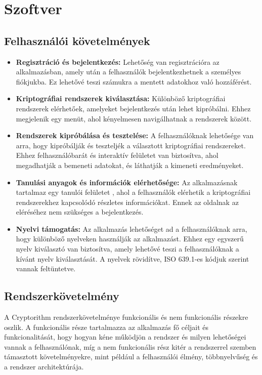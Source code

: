 \chapter{Szoftver}

\section{Felhasználói követelmények}

\begin{itemize}
	\item\textbf{Regisztráció és bejelentkezés:} Lehetőség van regisztrációra az alkalmazásban, amely után a felhasználók bejelentkezhetnek a személyes fiókjukba. Ez lehetővé teszi számukra a mentett adatokhoz való hozzáférést.

	\item\textbf{Kriptográfiai rendszerek kiválasztása:} Különböző kriptográfiai rendszerek elérhetőek, amelyeket bejelentkezés után lehet kipróbálni. Ehhez megjelenik egy menüt, ahol kényelmesen navigálhatnak a rendszerek között.

	\item\textbf{Rendszerek kipróbálása és tesztelése:} A felhasználóknak lehetősége van arra, hogy kipróbálják és teszteljék a választott kriptográfiai rendszereket. Ehhez felhasználóbarát és interaktív felületet van biztosítva, ahol megadhatják a bemeneti adatokat, és láthatják a kimeneti eredményeket.

	\item\textbf{Tanulási anyagok és információk elérhetősége:} Az alkalmazásnak tartalmaz egy tanulói felületet , ahol a felhasználók elérhetik a kriptográfiai rendszerekhez kapcsolódó részletes információkat. Ennek az oldalnak az eléréséhez nem szükséges a bejelentkezés.

	\item\textbf{Nyelvi támogatás:} Az alkalmazás lehetőséget ad a felhasználóknak arra, hogy különböző nyelveken használják az alkalmazást. Ehhez egy egyszerű nyelv kiválasztó van biztosítva, amely lehetővé teszi a felhasználóknak a kívánt nyelv kiválasztását. A nyelvek rövidítve, ISO 639.1-es kódjuk szerint vannak feltüntetve.
\end{itemize}

\newpage
\section{Rendszerkövetelmény}
A Cryptorithm rendszerkövetelménye funkcionális és nem funkcionális részekre oszlik. A funkcionális része tartalmazza az alkalmazás fő céljait és funkcionalitását, hogy hogyan kéne működjön a rendszer és milyen lehetőségei vannak a felhasználónak, míg a nem funkcionális rész kitér a rendszerrel szemben támasztott követelményekre, mint például a felhasználói élmény, többnyelvűség és a rendszer architektúrája.

